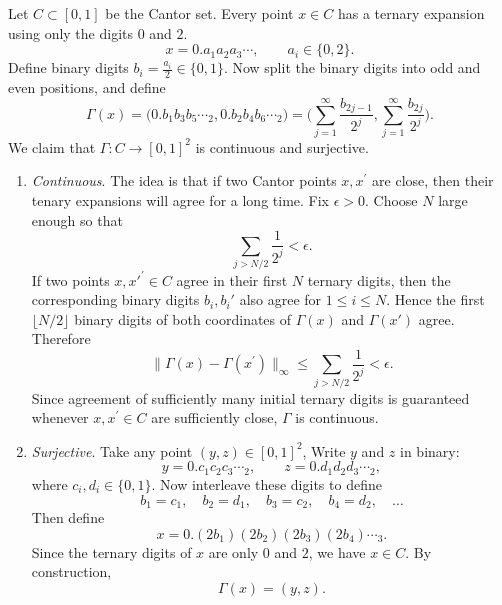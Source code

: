 	\begin{example}
	  \label{ex:space-filling-curve-in-r2}
		Let $C \subset [0,1]$ be the Cantor set. Every point $x \in C$ has a ternary expansion using only the digits $0$ and $2$. 
		\begin{equation}
			x = 0.a_1a_2a_3\cdots, \qquad a_i \in \{0,2\}.
		\end{equation}
		Define binary digits $b_i = \frac{a_i}{2} \in \{0,1\}$. Now split the binary digits into odd and even positions, and define
		\begin{equation}
			\Gamma(x) = \big(
				0.b_1b_3b_5\cdots_2,
				0.b_2b_4b_6\cdots_2
			\big) =
			\bigg(
				\sum_{j=1}^{\infty} \frac{b_{2j-1}}{2^j},
				\sum_{j=1}^{\infty} \frac{b_{2j}}{2^j}
			\bigg).
		\end{equation}
		We claim that $\Gamma: C \to [0, 1]^2$ is continuous and surjective. 
		\begin{enumerate}
		  \item \textit{Continuous}. The idea is that if two Cantor points $x, x^\prime$ are close, then their tenary expansions will agree for a long time. Fix $\epsilon > 0$. Choose $N$ large enough so that
				\begin{equation}
					\sum_{j > N/2} \frac{1}{2^j} < \epsilon.
				\end{equation}
				If two points $x,x'^\prime \in C$ agree in their first $N$ ternary digits, then the corresponding binary digits $b_i,b_i'$ also agree for $1 \leq i \leq N$. Hence the first $\lfloor N/2 \rfloor$ binary digits of both coordinates of $\Gamma(x)$ and $\Gamma(x')$ agree. Therefore
				\begin{equation}
					\|\Gamma(x)-\Gamma(x^\prime)\|_\infty \leq \sum_{j > N/2} \frac{1}{2^j} < \epsilon.
				\end{equation}
				Since agreement of sufficiently many initial ternary digits is guaranteed whenever $x,x^\prime \in C$ are sufficiently close, $\Gamma$ is continuous.
			
			\item \textit{Surjective}. Take any point $(y,z) \in [0,1]^2$, Write $y$ and $z$ in binary:
				\begin{equation}
					y = 0.c_1c_2c_3\cdots_2,
					\qquad
					z = 0.d_1d_2d_3\cdots_2,
				\end{equation}
				where $c_i,d_i \in \{0,1\}$. Now interleave these digits to define
				\begin{equation}
					b_1 = c_1,\quad b_2 = d_1,\quad b_3 = c_2,\quad b_4 = d_2,
					\quad \ldots
				\end{equation}
				Then define
				\begin{equation}
					x = 0.(2b_1)(2b_2)(2b_3)(2b_4)\cdots_3.
				\end{equation}
				Since the ternary digits of $x$ are only $0$ and $2$, we have $x \in C$.
				By construction,
				\begin{equation}
					\Gamma(x) = (y,z).
				\end{equation}
		\end{enumerate}
		

\end{example}
